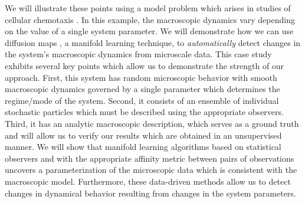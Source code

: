 \documentclass[preprint]{elsarticle}
\begin{document}
We will illustrate these points using a model problem which arises in studies of cellular chemotaxis \cite{othmer2000diffusion}.
%
In this example, the macroscopic dynamics vary depending on the value of a single system parameter.
%
We will demonstrate how we can use diffusion maps \cite{coifman2005geometric}, a manifold learning technique, to {\em automatically} detect changes in the system's macroscopic dynamics from microscale data.
%
This case study exhibits several key points which allow us to demonstrate the strength of our approach.
%
First, this system has random microscopic behavior with smooth macroscopic dynamics governed by a single parameter which determines the regime/mode of the system. 
%
Second, it consists of an ensemble of individual stochastic particles which must be described using the appropriate observers.
%
Third, it has an analytic macroscopic description, which serves as a ground truth and will allow us to verify our results which are obtained in an unsupervised manner.
%
We will show that manifold learning algorithms based on statistical observers and with the appropriate affinity metric between pairs of observations uncovers a parameterization of the microscopic data which is consistent with the macroscopic model.
%
Furthermore, these data-driven methods allow us to detect changes in dynamical behavior resulting from changes in the system parameters. 

%

\end{document}
